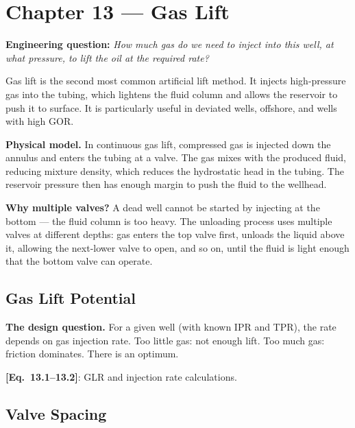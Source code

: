 \documentclass[11pt,a4paper,openany]{book}
\newcommand{\eqrefbook}[1]{\textcolor{blue!60!black}{\textbf{[Eq.~#1]}}}
\begin{document}
\chapter{Chapter 13 — Gas Lift}

\begin{purpose}
\textbf{Engineering question:} \emph{How much gas do we need to inject
into this well, at what pressure, to lift the oil at the required
rate?}

Gas lift is the second most common artificial lift method. It injects
high-pressure gas into the tubing, which lightens the fluid column and
allows the reservoir to push it to surface. It is particularly useful
in deviated wells, offshore, and wells with high GOR.
\end{purpose}

\begin{theory}
\textbf{Physical model.} In continuous gas lift, compressed gas is
injected down the annulus and enters the tubing at a valve. The gas
mixes with the produced fluid, reducing mixture density, which reduces
the hydrostatic head in the tubing. The reservoir pressure then has
enough margin to push the fluid to the wellhead.

\textbf{Why multiple valves?} A dead well cannot be started by
injecting at the bottom — the fluid column is too heavy. The
unloading process uses multiple valves at different depths: gas enters
the top valve first, unloads the liquid above it, allowing the
next-lower valve to open, and so on, until the fluid is light enough
that the bottom valve can operate.
\end{theory}

\section{Gas Lift Potential}

\begin{theory}
\textbf{The design question.} For a given well (with known IPR and
TPR), the rate depends on gas injection rate. Too little gas: not
enough lift. Too much gas: friction dominates. There is an optimum.
\end{theory}

\eqrefbook{13.1--13.2}: GLR and injection rate calculations.

\section{Valve Spacing}
\end{document}
